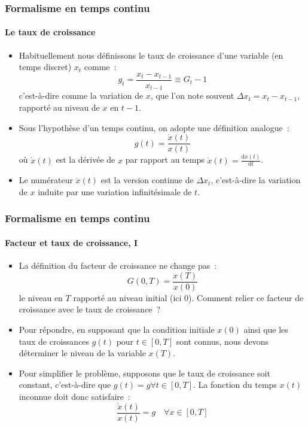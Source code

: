 \documentclass[10pt,notheorems]{beamer}
\theoremstyle{plain}
\theoremstyle{definition} %
\begin{document}
\begin{frame}
  \frametitle{Formalisme en temps continu}
  \framesubtitle{Le taux de croissance}

  \begin{itemize}

  \item Habituellement nous définissons le taux de croissance d'une variable (en temps discret) $x_t$ comme~:
    \[
      g_t = \frac{x_t-x_{t-1}}{x_{t-1}} \equiv G_t - 1
    \]
    c'est-à-dire comme la variation de $x$, que l'on note souvent
    $\Delta x_t = x_{t}-x_{t-1}$, rapporté au niveau de $x$ en $t-1$.\newline

  \item Sous l'hypothèse d'un temps continu, on adopte une définition analogue~:
    \[
      g(t) = \frac{\dot x(t)}{x(t)}
    \]
    où $\dot x(t)$ est la dérivée de $x$ par rapport au temps $\dot x(t) = \frac{\mathrm dx(t)}{\mathrm dt}$.\newline

  \item Le numérateur $\dot x(t)$ est la version continue de $\Delta x_t$, c'est-à-dire la variation de $x$ induite par une variation infinitésimale de $t$.

  \end{itemize}

\end{frame}


\begin{frame}
  \frametitle{Formalisme en temps continu}
  \framesubtitle{Facteur et taux de croissance, I}

  \begin{itemize}

  \item La définition du facteur de croissance ne change pas~:
    \[
      G(0,T) = \frac{x(T)}{x(0)}
    \]
    le niveau en $T$ rapporté au niveau initial (ici 0). Comment relier ce facteur de croissance avec le taux de croissance~?\newline

  \item Pour répondre, en supposant que la condition initiale $x(0)$ ainsi que les taux de
    croissances $g(t)$ pour $t\in[0,T]$ sont connus, nous devons
    déterminer le niveau de la variable $x(T)$.\newline

  \item Pour simplifier le problème, supposons que le taux de croissance soit constant, c'est-à-dire que $g(t)=g \forall t\in[0,T]$. La fonction du temps $x(t)$ inconnue doit donc satisfaire~:
    \[
      \frac{\dot x(t)}{x(t)} = g \quad \forall x\in [0,T]
    \]

  \end{itemize}

\end{frame}
\end{document}
